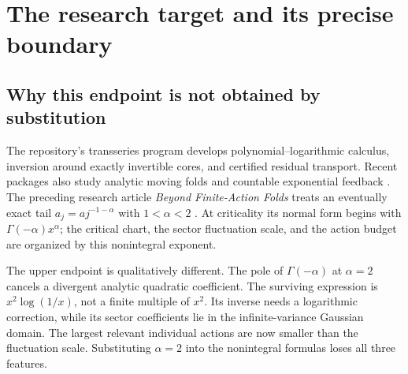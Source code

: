 \documentclass[11pt,a4paper]{article}
\numberwithin{equation}{section}
\theoremstyle{definition}
\theoremstyle{remark}
\begin{document}
\clearpage
\begingroup
\small
\setlength{\parskip}{0pt}
\tableofcontents
\endgroup
\clearpage

\section{The research target and its precise boundary}
\label{sec:intro}

\subsection{Why this endpoint is not obtained by substitution}
The repository's transseries program develops polynomial--logarithmic
calculus, inversion around exactly invertible cores, and certified residual
transport. Recent packages also study analytic moving folds and countable
exponential feedback \cite{repo,fold}. The preceding research article
\emph{Beyond Finite-Action Folds} treats an eventually exact tail
$a_j=a j^{-1-\alpha}$ with $1<\alpha<2$ \cite{previous}. At criticality its
normal form begins with $\Gamma(-\alpha)x^\alpha$; the critical chart, the
sector fluctuation scale, and the action budget are organized by this
nonintegral exponent.

The upper endpoint is qualitatively different. The pole of
$\Gamma(-\alpha)$ at $\alpha=2$ cancels a divergent analytic quadratic
coefficient. The surviving expression is $x^2\log(1/x)$, not a finite
multiple of $x^2$. Its inverse needs a logarithmic correction, while its
sector coefficients lie in the infinite-variance Gaussian domain. The
largest relevant individual actions are now smaller than the fluctuation
scale. Substituting $\alpha=2$ into the nonintegral formulas loses all three
features.
\end{document}
